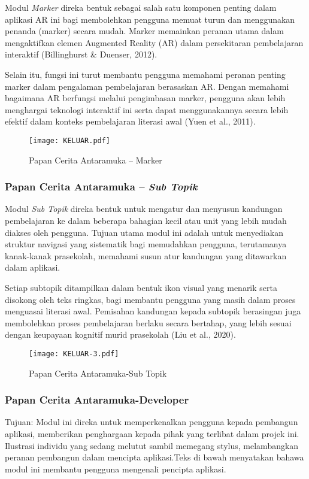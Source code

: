 Modul \textit{Marker} direka bentuk sebagai salah satu komponen penting dalam aplikasi AR ini bagi membolehkan pengguna memuat turun dan menggunakan penanda (marker) secara mudah. Marker memainkan peranan utama dalam mengaktifkan elemen Augmented Reality (AR) dalam persekitaran pembelajaran interaktif (Billinghurst & Duenser, 2012). 



Selain itu, fungsi ini turut membantu pengguna memahami peranan penting marker dalam pengalaman pembelajaran berasaskan AR. Dengan memahami bagaimana AR berfungsi melalui pengimbasan marker, pengguna akan lebih menghargai teknologi interaktif ini serta dapat menggunakannya secara lebih efektif dalam konteks pembelajaran literasi awal (Yuen et al., 2011).
\begin{figure}
    \centering
    \texttt{[image: KELUAR.pdf]}
    \caption{Papan Cerita Antaramuka – Marker}
    \label{fig:enter-label}
\end{figure}

\subsubsection{Papan Cerita Antaramuka – \textit{Sub Topik}}

Modul \textit{Sub Topik} direka bentuk untuk mengatur dan menyusun kandungan pembelajaran ke dalam beberapa bahagian kecil atau unit yang lebih mudah diakses oleh pengguna. Tujuan utama modul ini adalah untuk menyediakan struktur navigasi yang sistematik bagi memudahkan pengguna, terutamanya kanak-kanak prasekolah, memahami susun atur kandungan yang ditawarkan dalam aplikasi.

 Setiap subtopik ditampilkan dalam bentuk ikon visual yang menarik serta disokong oleh teks ringkas, bagi membantu pengguna yang masih dalam proses menguasai literasi awal. Pemisahan kandungan kepada subtopik berasingan juga membolehkan proses pembelajaran berlaku secara bertahap, yang lebih sesuai dengan keupayaan kognitif murid prasekolah (Liu et al., 2020).

\begin{figure}
    \centering
    \texttt{[image: KELUAR-3.pdf]}
    \caption{Papan Cerita Antaramuka-Sub Topik}
    \label{fig:enter-label}
\end{figure}




\subsubsection{Papan Cerita Antaramuka-Developer}
Tujuan: Modul ini direka untuk memperkenalkan pengguna kepada pembangun aplikasi, memberikan penghargaan kepada pihak yang terlibat dalam projek ini. Ilustrasi individu yang sedang melutut sambil memegang stylus, melambangkan peranan pembangun dalam mencipta aplikasi.Teks di bawah menyatakan bahawa modul ini membantu pengguna mengenali pencipta aplikasi.


